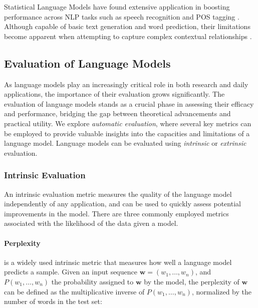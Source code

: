 
Statistical Language Models have found extensive application in boosting performance across \ac{NLP} tasks such as speech recognition \citep{bahl1989tree} and \ac{POS} tagging \citep{thede1999second}. Although capable of basic text generation and word prediction, their limitations become apparent when attempting to capture complex contextual relationships \citep{rosenfeld2000two, arisoy2012deep}.


\subsection{Evaluation of Language Models}

As language models play an increasingly critical role in both research and daily applications, the importance of their evaluation grows significantly. The evaluation of language models stands as a crucial phase in assessing their efficacy and performance, bridging the gap between theoretical advancements and practical utility. We explore \textit{automatic evaluation}, where several key metrics can be employed to provide valuable insights into the capacities and limitations of a language model. Language models can be evaluated using \textit{intrinsic} or \textit{extrinsic} evaluation. 

\subsubsection{Intrinsic Evaluation} 

An intrinsic evaluation metric measures the quality of the language model independently of any application, and can be used to quickly assess potential improvements in the model.  There are three commonly employed metrics associated with the likelihood of the data given a model.

\paragraph{Perplexity} is a widely used intrinsic metric that measures how well a language model predicts a sample. Given an input sequence $\bm{w} = (w_1, \ldots, w_n)$, and $P(w_1, \ldots, w_n)$ the probability assigned to $\bm{w}$ by the model, the perplexity of $\bm{w}$ can be defined as the multiplicative inverse of $P(w_1, \ldots, w_n)$, normalized by the number of words in the test set:

